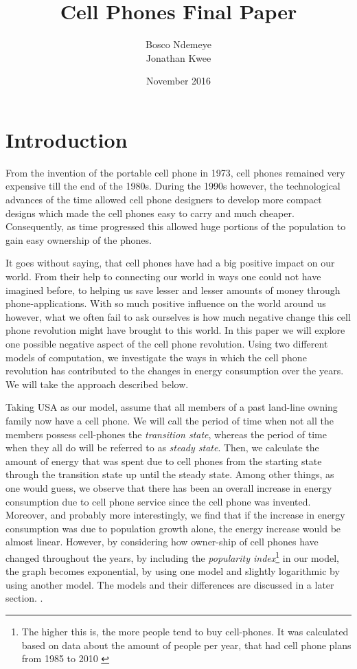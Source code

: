 \documentclass{article}
\title{Cell Phones Final Paper}
\author{Bosco Ndemeye\\ Jonathan Kwee}
\date{November 2016}
\begin{document}
\maketitle

\section{Introduction}
From the invention of the portable cell phone in 1973, cell phones remained very expensive till the end of the 1980s. During the 1990s however, the technological advances of the time allowed cell phone designers to develop more compact designs which made the cell phones easy to carry and much cheaper. Consequently, as time progressed this allowed huge portions of the population to gain easy ownership of the phones. \par It goes without saying, that cell phones have had a big positive impact on our world. From their help to connecting our world in ways one could not have imagined before, to helping us save lesser and lesser amounts of money through phone-applications. With so much positive influence on the world around us however, what we often fail to ask ourselves is how much negative change this cell phone revolution might have brought to this world. In this paper we will explore one possible negative aspect of the cell phone revolution. Using two different models of computation, we investigate the ways in which the cell phone revolution has contributed to the changes in energy consumption over the years.  We will take the approach described below. \par 
Taking USA as our model, assume that all members of a past land-line owning family now have a cell phone. We will call the period of time when not all the members possess cell-phones the \textit{transition state}, whereas the period of time when they all do will be referred to as \textit{steady state}. Then, we calculate the amount of energy that was spent due to cell phones from the starting state through the transition state up until the steady state. Among other things, as one would guess, we observe that there has been an overall increase in energy consumption due to cell phone service since the cell phone was invented. Moreover, and probably more interestingly, we find that if the increase in energy consumption was due to population growth alone, the energy increase would be almost linear. However, by considering how owner-ship of cell phones have changed  throughout the years, by including the \textit{popularity index}\footnote{The higher this is, the more people tend to buy cell-phones. It was calculated based on data  about the amount of people per year, that had cell phone plans from 1985 to 2010 \cite{subscribers}} in our model,
the graph becomes exponential, by using one model and slightly logarithmic by using another model. The models and their differences are discussed in a later section.
. 
\end{document}
